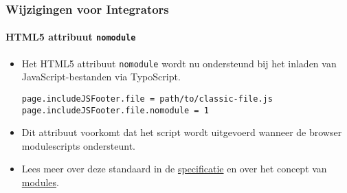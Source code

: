 
\begin{frame}[fragile]
	\frametitle{Wijzigingen voor Integrators}
	\framesubtitle{HTML5 attribuut \texttt{nomodule}}

	\lstset{basicstyle=\tiny\ttfamily}

	\begin{itemize}
		\item Het HTML5 attribuut \texttt{nomodule} wordt nu ondersteund bij het inladen van JavaScript-bestanden via TypoScript.
\begin{lstlisting}
page.includeJSFooter.file = path/to/classic-file.js
page.includeJSFooter.file.nomodule = 1
\end{lstlisting}

		\item Dit attribuut voorkomt dat het script wordt uitgevoerd wanneer de browser modulescripts ondersteunt.

		\item Lees meer over deze standaard in de
			\href{https://html.spec.whatwg.org/multipage/scripting.html#attr-script-nomodule}{specificatie}
			en over het concept van
			\href{https://hacks.mozilla.org/2015/08/es6-in-depth-modules/}{modules}.

	\end{itemize}


\end{frame}


